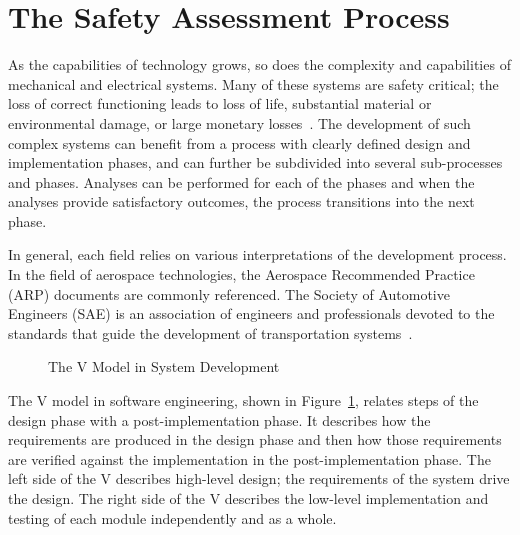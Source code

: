 \section{The Safety Assessment Process}
\label{sec:process}
As the capabilities of technology grows, so does the complexity and capabilities of mechanical and electrical systems. Many of these systems are safety critical; the loss of correct functioning leads to loss of life, substantial material or environmental damage, or large monetary losses~\cite{SAE}. The development of such complex systems can benefit from a process with clearly defined design and implementation phases, and can further be subdivided into several sub-processes and phases. Analyses can be performed for each of the phases and when the analyses provide satisfactory outcomes, the process transitions into the next phase. 

In general, each field relies on various interpretations of the development process. In the field of aerospace technologies, the Aerospace Recommended Practice (ARP) documents are commonly referenced. The Society of Automotive Engineers (SAE) is an association of engineers and professionals devoted to the standards that guide the development of transportation systems~\cite{SAE:ARP4761, SAE:ARP4754A}. 

\begin{figure}[!htb]
        \caption{\label{fig:v1} The V Model in System Development}
\end{figure}

The V model in software engineering, shown in Figure~\ref{fig:v1}, relates steps of the design phase with a post-implementation phase. It describes how the requirements are produced in the design phase and then how those requirements are verified against the implementation in the post-implementation phase. The left side of the V describes high-level design; the requirements of the system drive the design. The right side of the V describes the low-level implementation and testing of each module independently and as a whole. 

